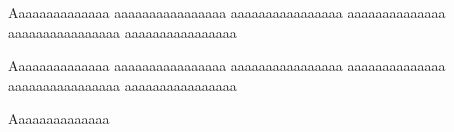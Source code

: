 \documentclass[a4paper]{article}
\begin{document}
Aaaaaaaaaaaaaa aaaaaaaaaaaaaaaa aaaaaaaaaaaaaaaa
aaaaaaaaaaaaaa aaaaaaaaaaaaaaaa aaaaaaaaaaaaaaaa


\setlength{\parindent}{1.5cm}
Aaaaaaaaaaaaaa aaaaaaaaaaaaaaaa aaaaaaaaaaaaaaaa
aaaaaaaaaaaaaa aaaaaaaaaaaaaaaa aaaaaaaaaaaaaaaa

Aaaaaaaaaaaaaa
\end{document}
